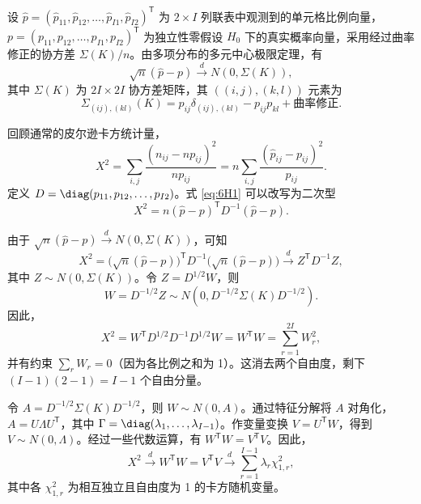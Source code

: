 

设 $\hat p=(\hat p_{11},\hat p_{12},\ldots,\hat p_{I1},\hat p_{I2})^{\mathsf T}$ 为 $2\times I$ 列联表中观测到的单元格比例向量，$p=(p_{11},p_{12},\ldots,p_{I1},p_{I2})^{\mathsf T}$ 为独立性零假设 $H_0$ 下的真实概率向量，采用经过曲率修正的协方差 $\Sigma(K)/n$。由多项分布的多元中心极限定理，有
\[
  \sqrt n(\hat p-p)\xrightarrow{d}N(0,\Sigma(K)),
\]
其中 $\Sigma(K)$ 为 $2I\times 2I$ 协方差矩阵，其 $((i,j),(k,l))$ 元素为
\[
  \Sigma_{(ij),(kl)}(K)=p_{ij}\delta_{(ij),(kl)}-p_{ij}p_{kl}+\text{曲率修正}.
\]


回顾通常的皮尔逊卡方统计量，
\begin{equation*}
  X^2=\sum_{i,j}\frac{(n_{ij}-np_{ij})^2}{np_{ij}}
       =n\sum_{i,j}\frac{(\hat p_{ij}-p_{ij})^2}{p_{ij}}.
  \tag{6H1}\label{eq:6H1}
\end{equation*}
定义 $D=\diag(p_{11},p_{12},\ldots,p_{I2})$。式 \eqref{eq:6H1} 可以改写为二次型
\begin{equation*}
  X^2=n(\hat p-p)^{\mathsf T}D^{-1}(\hat p-p).
  \tag{6H2}\label{eq:6H2}
\end{equation*}


由于 $\sqrt n(\hat p-p)\xrightarrow{d}N(0,\Sigma(K))$，可知
\[
  X^2=\bigl(\sqrt n(\hat p-p)\bigr)^{\mathsf T}D^{-1}
       \bigl(\sqrt n(\hat p-p)\bigr)\xrightarrow{d}Z^{\mathsf T}D^{-1}Z,
\]
其中 $Z\sim N(0,\Sigma(K))$。令 $Z=D^{1/2}W$，则
\[
  W=D^{-1/2}Z\sim N(0,D^{-1/2}\Sigma(K)D^{-1/2}).
\]
因此，
\[
  X^2=W^{\mathsf T}D^{1/2}D^{-1}D^{1/2}W
     =W^{\mathsf T}W=\sum_{r=1}^{2I}W_r^2,
\]
并有约束 $\sum_r W_r=0$（因为各比例之和为 1）。这消去两个自由度，剩下 $(I-1)(2-1)=I-1$ 个自由分量。


令 $A=D^{-1/2}\Sigma(K)D^{-1/2}$，则 $W\sim N(0,A)$。通过特征分解将 $A$ 对角化，$A=U\Lambda U^{\mathsf T}$，其中 $\Gamma=\diag(\lambda_1,\ldots,\lambda_{I-1})$。作变量变换 $V=U^{\mathsf T}W$，得到 $V\sim N(0,\Lambda)$。经过一些代数运算，有 $W^{\mathsf T}W=V^{\mathsf T}V$。因此，
\begin{equation*}
  X^2\xrightarrow{d}W^{\mathsf T}W
    =V^{\mathsf T}V\xrightarrow{d}\sum_{r=1}^{I-1}\lambda_r\chi_{1,r}^2,
  \tag{6H3}\label{eq:6H3}
\end{equation*}
其中各 $\chi_{1,r}^2$ 为相互独立且自由度为 1 的卡方随机变量。

